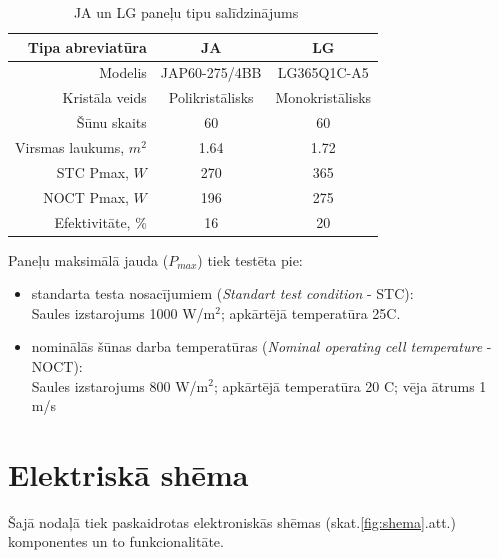 \begin{table}[h]
    \caption{JA un LG paneļu tipu salīdzinājums~\cite{JAtips}~\cite{LGtips}} %
    \begin{center}
    \begin{tabular}{| r | c | c |}
    \hline
    Tipa abreviatūra & JA & LG \\ \hline
    Modelis &  JAP60-275/4BB & LG365Q1C-A5\\ \hline
	Kristāla veids & Polikristālisks & Monokristālisks \\ \hline
	Šūnu skaits  &60  &60 \\ \hline
	Virsmas laukums, $m^2$ &1.64  &1.72 \\ \hline
	STC Pmax, $W$ 	&270 &365\\ \hline
	NOCT Pmax, $W$  &196 &275\\ \hline
	Efektivitāte, \% &16 & 20\\ \hline
    \end{tabular}
    \end{center}
    \label{tab:ja_lg_tipi}
\end{table}

Paneļu maksimālā jauda ($P_{max}$) tiek testēta pie:
\begin{itemize}
\item standarta testa nosacījumiem (\textit{Standart test condition} - STC):\\
Saules izstarojums 1000 W/m$^2$; apkārtējā temperatūra 25\textdegree C.
\item nominālās šūnas darba temperatūras (\textit{Nominal operating cell temperature} - NOCT):\\
Saules izstarojums 800 W/m$^2$; apkārtējā temperatūra 20 \textdegree C; vēja ātrums 1 m/s
\end{itemize}


\section{Elektriskā shēma}

Šajā nodaļā tiek paskaidrotas elektroniskās shēmas (skat.\ref{fig:shema}.att.) komponentes un to funkcionalitāte.

